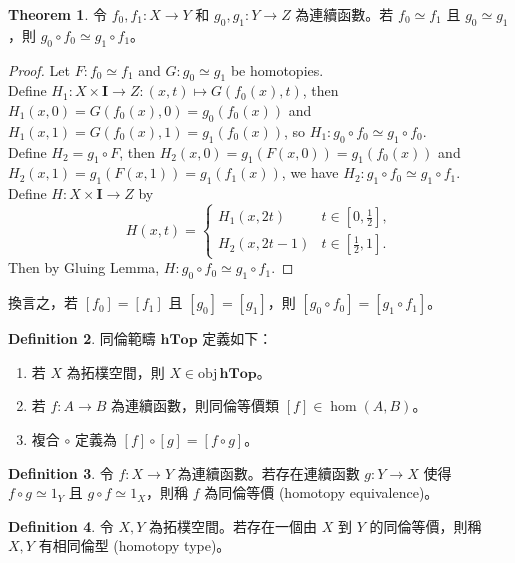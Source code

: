 \documentclass[12pt]{article}
\theoremstyle{definition}
\newtheorem{definition}{Definition}[section]
\newtheorem{theorem}[definition]{Theorem}
\newcommand\<{\langle}
\renewcommand\>{\rangle}
\newcommand\obj{\mathrm{obj}\hspace{2pt}}
\begin{document}
\begin{CJK}{UTF8}{bsmi}
\begin{theorem}
    令 $f_0, f_1:X\to Y$ 和 $g_0, g_1:Y\to Z$ 為連續函數。若 $f_0\simeq f_1$ 且 $g_0\simeq g_1$，則 $g_0\circ f_0\simeq g_1\circ f_1$。
\end{theorem}
\begin{proof}
    Let $F:f_0\simeq f_1$ and $G:g_0\simeq g_1$ be homotopies. \\
    Define $H_1:X\times\textbf{I}\to Z:(x, t)\mapsto G(f_0(x), t)$, then $H_1(x, 0)=G(f_0(x), 0)=g_0(f_0(x))$ and $H_1(x, 1)=G(f_0(x), 1)=g_1(f_0(x))$, so $H_1:g_0\circ f_0\simeq g_1\circ f_0$. \\
    Define $H_2=g_1\circ F$, then $H_2(x, 0)=g_1(F(x, 0))=g_1(f_0(x))$ and $H_2(x, 1)=g_1(F(x, 1))=g_1(f_1(x))$, we have $H_2:g_1\circ f_0\simeq g_1\circ f_1$. \\
    Define $H:X\times\textbf{I}\to Z$ by
    \[
        H(x, t) = \begin{cases}
            H_1(x, 2t) & t\in[0, \frac{1}{2}], \\
            H_2(x, 2t-1) & t\in[\frac{1}{2}, 1].
        \end{cases}
    \]
    Then by Gluing Lemma, $H:g_0\circ f_0\simeq g_1\circ f_1$.
\end{proof}

換言之，若 $[f_0]=[f_1]$ 且 $[g_0]=[g_1]$，則 $[g_0\circ f_0]=[g_1\circ f_1]$。

\begin{definition}
    同倫範疇 $\textbf{hTop}$ 定義如下：
    \begin{enumerate}
        \item 若 $X$ 為拓樸空間，則 $X\in\obj\textbf{hTop}$。
        \item 若 $f:A\to B$ 為連續函數，則同倫等價類 $[f]\in\hom(A, B)$。
        \item 複合 $\circ$ 定義為 $[f]\circ[g]=[f\circ g]$。
    \end{enumerate}
\end{definition}

\begin{definition}
    令 $f:X\to Y$ 為連續函數。若存在連續函數 $g:Y\to X$ 使得 $f\circ g\simeq 1_Y$ 且 $g\circ f\simeq 1_X$，則稱 $f$ 為同倫等價 (homotopy equivalence)。
\end{definition}

\begin{definition}
    令 $X, Y$ 為拓樸空間。若存在一個由 $X$ 到 $Y$ 的同倫等價，則稱 $X, Y$ 有相同倫型 (homotopy type)。
\end{definition}


\end{CJK}
\end{document}
